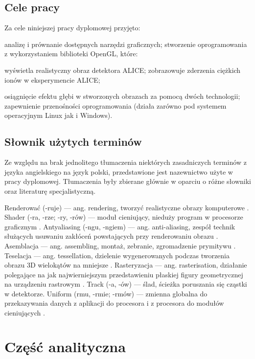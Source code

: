 \subsection{Cele pracy}
Za cele niniejszej pracy dyplomowej przyjęto:
\begin{itemize}
\itemi analizę i prównanie dostępnych narzędzi graficznych;
\itemi stworzenie oprogramowania z wykorzystaniem biblioteki OpenGL, które:
	\begin{itemize}
	\itemii wyświetla realistyczny obraz detektora ALICE;
	\itemii zobrazowuje zderzenia ciężkich ionów w eksperymencie ALICE;
	\end{itemize}
\itemi osiągnięcie efektu głębi w stworzonych obrazach za pomocą dwóch technologii;
\itemi zapewnienie przenośności oprogramowania (działa zarówno pod systemem operacyjnym Linux jak i Windows).
\end{itemize}

\subsection{Słownik użytych terminów}
Ze względu na brak jednolitego tłumaczenia niektórych zasadniczych terminów z języka angielskiego na język polski, przedstawione jest nazewnictwo użyte w pracy dyplomowej. Tłumaczenia były zbierane głównie w oparciu o różne słowniki oraz literaturę specjalistyczną.
\begin{itemize}
\itemi Renderować (-ruje) --- ang. rendering, tworzyć realistyczne obrazy komputerowe \cite{pwn}.
\itemi Shader (-ra, -rze; -ry, -rów) --- moduł cieniujący, nieduży program w procesorze graficznym \cite{slownik}.
\itemi Antyaliasing (-ngu, -ngiem)  --- ang. anti-aliasing, zespół technik służących usuwaniu zakłóceń powstających przy renderowaniu obrazu \cite{wprowadzeniedografiki}.
\itemi Asemblacja --- ang. assembling, montaż, zebranie, zgromadzenie prymitywu \cite{slownik}.
\itemi Teselacja --- ang. tessellation, dzielenie wygenerowanych podczas tworzenia obrazu 3D wielokątów na mniejsze \cite{slownik}.
\itemi Rasteryzacja --- ang. rasterisation, działanie polegające na jak najwierniejszym przedstawieniu płaskiej figury geometrycznej na urządzeniu rastrowym \cite{slownik}.
\itemi Track (-a, -ów) --- ślad, ścieżka poruszania się cząstki w detektorze.
\itemi Uniform (rmu, -rmie; -rmów) --- zmienna globalna do przekazywania danych z aplikacji do procesora i z procesora do modułów cieniujących \cite{slownik}.
\end{itemize}

\newpage
\section[Część analityczna]{Część analityczna}
